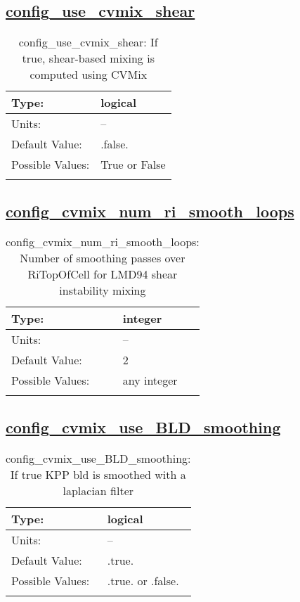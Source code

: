 \subsection[config\_use\_cvmix\_shear]{\hyperref[sec:nm_tab_cvmix]{config\_use\_cvmix\_shear}}
\label{subsec:nm_sec_config_use_cvmix_shear}
\begin{center}
\begin{longtable}{| p{2.0in} || p{4.0in} |}
    \hline
    Type: & logical \\
    \hline
    Units: & -- \\
    \hline
    Default Value: & .false. \\
    \hline
    Possible Values: & True or False \\
    \hline
    \caption{config\_use\_cvmix\_shear: If true, shear-based mixing is computed using CVMix}
\end{longtable}
\end{center}
\subsection[config\_cvmix\_num\_ri\_smooth\_loops]{\hyperref[sec:nm_tab_cvmix]{config\_cvmix\_num\_ri\_smooth\_loops}}
\label{subsec:nm_sec_config_cvmix_num_ri_smooth_loops}
\begin{center}
\begin{longtable}{| p{2.0in} || p{4.0in} |}
    \hline
    Type: & integer \\
    \hline
    Units: & -- \\
    \hline
    Default Value: & 2 \\
    \hline
    Possible Values: & any integer \\
    \hline
    \caption{config\_cvmix\_num\_ri\_smooth\_loops: Number of smoothing passes over RiTopOfCell for LMD94 shear instability mixing}
\end{longtable}
\end{center}
\subsection[config\_cvmix\_use\_BLD\_smoothing]{\hyperref[sec:nm_tab_cvmix]{config\_cvmix\_use\_BLD\_smoothing}}
\label{subsec:nm_sec_config_cvmix_use_BLD_smoothing}
\begin{center}
\begin{longtable}{| p{2.0in} || p{4.0in} |}
    \hline
    Type: & logical \\
    \hline
    Units: & -- \\
    \hline
    Default Value: & .true. \\
    \hline
    Possible Values: & .true. or .false. \\
    \hline
    \caption{config\_cvmix\_use\_BLD\_smoothing: If true KPP bld is smoothed with a laplacian filter}
\end{longtable}
\end{center}
